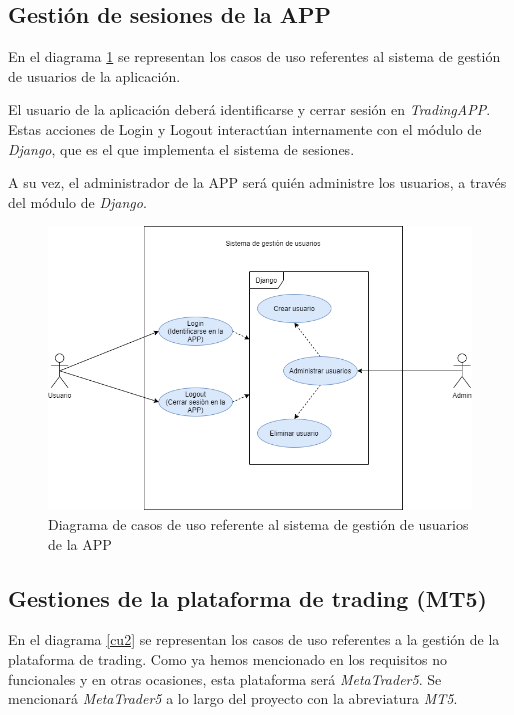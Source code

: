 \subsection{Gestión de sesiones de la APP}

En el diagrama \ref{cu1} se representan los casos de uso referentes al sistema de gestión de usuarios de la aplicación. \newline

El usuario de la aplicación deberá identificarse y cerrar sesión en \textit{TradingAPP}. Estas acciones de Login y Logout interactúan internamente con el módulo de \textit{Django}, que es el que implementa el sistema de sesiones. \newline

A su vez, el administrador de la APP será quién administre los usuarios, a través del módulo de \textit{Django}. 

\begin{figure}[h] 
	\includegraphics[width=1\textwidth]{imagenes/diagramas_casos_de_uso/CU1-gestion_usuarios.png} 
	\caption{Diagrama de casos de uso referente al sistema de gestión de usuarios de la APP} \label{cu1}
\end{figure}

\subsection{Gestiones de la plataforma de trading (MT5)}

En el diagrama \ref{cu2} se representan los casos de uso referentes a la gestión de la plataforma de trading. Como ya hemos mencionado en los requisitos no funcionales y en otras ocasiones, esta plataforma será \textit{MetaTrader5}. Se mencionará \textit{MetaTrader5} a lo largo del proyecto con la abreviatura \textit{MT5}. \newline

